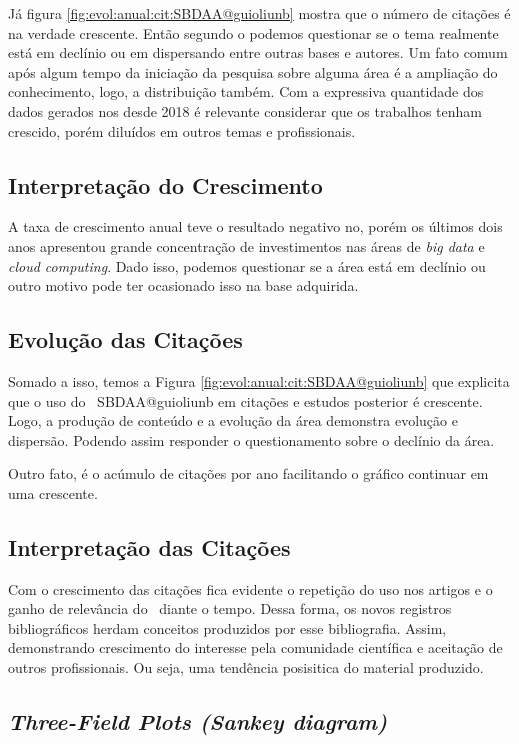 Já figura \ref{fig:evol:anual:cit:SBDAA@guioliunb} mostra que o número de citações é na verdade crescente. Então segundo o podemos questionar se o tema realmente está em declínio ou em dispersando entre outras bases e autores. Um fato comum após algum tempo da iniciação da pesquisa sobre alguma área é a ampliação do conhecimento, logo, a distribuição também. Com a expressiva quantidade dos dados gerados nos desde 2018 é relevante considerar que os trabalhos tenham crescido, porém diluídos em outros temas e profissionais.

\subsection{Interpretação do Crescimento} 

A taxa de crescimento anual teve o resultado negativo no, porém os últimos dois anos apresentou grande concentração de investimentos nas áreas de \textit{big data} e \textit{cloud computing}. Dado isso, podemos questionar se a área está em declínio ou outro motivo pode ter ocasionado isso na base adquirida.

\subsection{Evolução das Citações}

Somado a isso, temos a Figura \ref{fig:evol:anual:cit:SBDAA@guioliunb} que explicita que o uso do \dataset\  SBDAA@guioliunb em citações e estudos posterior é crescente. Logo, a produção de conteúdo e a evolução da área demonstra evolução e dispersão. Podendo assim responder o questionamento sobre o declínio da área.

Outro fato, é o acúmulo de citações por ano facilitando o gráfico continuar em uma crescente.



\subsection{Interpretação das Citações}
Com o crescimento das citações fica evidente o repetição do uso nos artigos e o ganho de relevância do \dataset\ diante o tempo. Dessa forma, os novos registros bibliográficos herdam conceitos produzidos por esse bibliografia. Assim, demonstrando crescimento do interesse pela comunidade científica e aceitação de outros profissionais. Ou seja, uma tendência posisitica do material produzido.

\subsection{\textit{Three-Field Plots (Sankey diagram)} \label{SBDAA:Sankey}}


